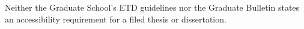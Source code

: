 %
%
%
%
%
%


	{Neither the Graduate School's ETD guidelines nor the Graduate Bulletin
	 states an accessibility requirement for a filed thesis or dissertation.}

